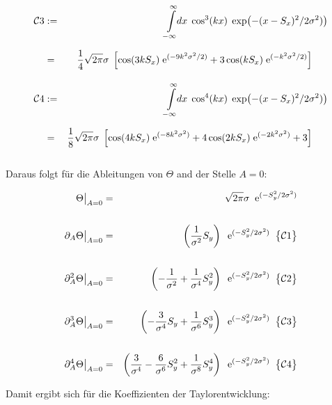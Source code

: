 \begin{small}
\begin{eqnarray*}
{\cal C}3 &:=&\int\limits_{-\infty}^{\infty}\!\!dx\;\cos^3(kx)\;\exp\!\left(-(x-S_x)^2/2\sigma^2)\right)\\
&=&\frac{1}{4}\sqrt{2\pi}\sigma\;\left[\cos(3kS_x)\;{\rm e}^{(-9k^2\sigma^2/2)}+3\cos(kS_x)\;{\rm e}^{(-k^2\sigma^2/2)}\right]\phantom{\int\limits_{-\infty}^{\infty}}\\
{\cal C} 4 &:=&\int\limits_{-\infty}^{\infty}\!\!dx\;\cos^4(kx)\;\exp\!\left(-(x-S_x)^2/2\sigma^2)\right)\\
&=&\frac{1}{8}\sqrt{2\pi}\sigma\;\left[\cos(4kS_x)\;{\rm e}^{(-8k^2\sigma^2)}+4\cos(2kS_x)\;{\rm e}^{(-2k^2\sigma^2)}+3\right]\phantom{\int\limits_{-\infty}^{\infty}}
\end{eqnarray*}
\end{small}

\noindent Daraus folgt für die Ableitungen von $\Theta$ and der Stelle $A=0$:

\begin{small}
\begin{eqnarray*}
\Theta\big\vert_{A=0} &=& \sqrt{2\pi}\sigma\;\;{\rm e}^{(-S_y^2/2\sigma^2)}\\
&&\\
{\partial_A}
\Theta\big\vert_{A=0}&=&\left(\frac{1}{\sigma^2}S_y\right)\;\;{\rm e}^{(-S_y^2/2\sigma^2)}\;\;{\big\{}{\cal C}1{\big\}}\\
&&\\
{\partial^2_A}
\Theta\big\vert_{A=0}&=&\left(-\frac{1}{\sigma^2}+\frac{1}{\sigma^4}S_y^2\right)\;\;{\rm e}^{(-S_y^2/2\sigma^2)}\;\;{\big\{}{\cal C}2{\big\}}\\
&&\\
{\partial^3_A}
\Theta\big\vert_{A=0}&=&\left(-\frac{3}{\sigma^4}S_y+\frac{1}{\sigma^6}S_y^3\right)\;\;{\rm e}^{(-S_y^2/2\sigma^2)}\;\;{\big\{}{\cal C}3{\big\}}\\
&&\\
{\partial^4_A}
\Theta\big\vert_{A=0}&=&\left(\frac{3}{\sigma^4}-\frac{6}{\sigma^6}S_y^2+\frac{1}{\sigma^8}S_y^4\right)\;\;{\rm e}^{(-S_y^2/2\sigma^2)}\;\;{\big\{}{\cal C}4{\big\}}\\
\end{eqnarray*}
\end{small}

\noindent Damit ergibt sich für die Koeffizienten der Taylorentwicklung:

